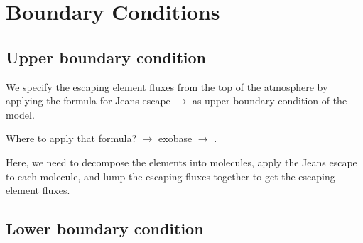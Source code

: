 \documentclass[11pt]{article}
\begin{document}
\section{Boundary Conditions}
\subsection{Upper boundary condition}
\label{UpperBound}

We specify the escaping element fluxes from the top of the atmosphere 
by applying the formula for Jeans escape $\to$ \citet{Tian2015} as
upper boundary condition of the model.

\noindent Where to apply that formula? $\to$ exobase $\to$ \citet{Volkov2011}.

\noindent Here, we need to decompose the elements into molecules,
apply the Jeans escape to each molecule, and lump the escaping fluxes
together to get the escaping element fluxes. 

\subsection{Lower boundary condition}
\label{LowerBound}
\end{document}
